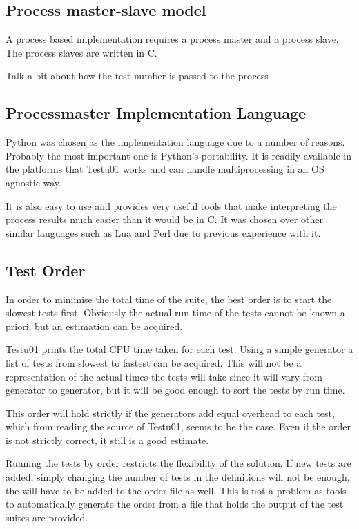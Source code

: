 \subsection{Process master-slave model}
A process based implementation requires a process master and a process slave. The process slaves are written in C.

Talk a bit about how the test number is passed to the process

\subsection{Processmaster Implementation Language}
Python was chosen as the implementation language due to a number of reasons. Probably the most important one is Python's portability. It is readily available in the platforms that Testu01 works and can handle multiprocessing in an OS agnostic way.

It is also easy to use and provides very useful tools that make interpreting the process results much easier than it would be in C. It was chosen over other similar languages such as Lua and Perl due to previous experience with it.

\subsection{Test Order}
In order to minimise the total time of the suite, the best order is to start the slowest tests first. Obviously the actual run time of the tests cannot be known a priori, but an estimation can be acquired.

Testu01 prints the total CPU time taken for each test. Using a simple generator a list of tests from slowest to fastest can be acquired. This will not be a representation of the actual times the tests will take since it will vary from generator to generator, but it will be good enough to sort the tests by run time.

This order will hold strictly if the generators add equal overhead to each test, which from reading the source of Testu01, seems to be the case. Even if the order is not strictly correct, it still is a good estimate.

Running the tests by order restricts the flexibility of the solution. If new tests are added, simply changing the number of tests in the definitions will not be enough, the will have to be added to the order file as well. This is not a problem as tools to automatically generate the order from a file that holds the output of the test suites are provided.


